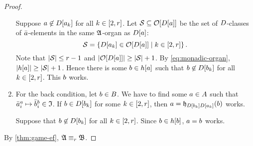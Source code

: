 \begin{proof}
\begin{enumerate}
  Suppose $a \not\in D[a_{k}]$ for all $k \in [2,r]$.
  Let $\mathcal{S} \subseteq \mathcal{O}[D[a]]$ be the set of $D$-classes of
  $\bar{a}$-elements in the same $\mathfrak{A}$-organ as $D[a]$:
  \[
    \mathcal{S} = \left\{D[a_{k}] \in \mathcal{O}[D[a]]\mathrel{}\middle|\mathrel{}k \in [2,r]\right\}.
  \]
  Note that $\left|\mathcal{S}\right| \leq r-1$ and
  $\left|\mathcal{O}[D[a]]\right| \geq \left|\mathcal{S}\right| + 1$.
  By \cref{eq:monadic-organ}, $\left|h[a]\right| \geq \left|\mathcal{S}\right| + 1$.
  Hence there is some $b \in h[a]$ such that $b \not\in
  D[b_{k}]$ for all $k \in [2,r]$. This $b$ works.
  \item For the back condition, let $b \in B$.
  We have to find some $a \in A$ such that
  $\bar{a}_{i}^{a} \mapsto \bar{b}_{i}^{b} \in \mathfrak{I}$.
  If $b \in D[b_{k}]$ for some $k \in [2,r]$,
  then $a = \mathfrak{h}_{D[b_{k}]D[a_{k}]}(b)$ works.
  
  Suppose that $b \not\in D[b_{k}]$ for all $k \in [2,r]$.
  Since $b \in h[b]$, $a = b$ works.
\end{enumerate}
By \cref{thm:game-ef}, $\mathfrak{A} \equiv_{r} \mathfrak{B}$.
\end{proof}
